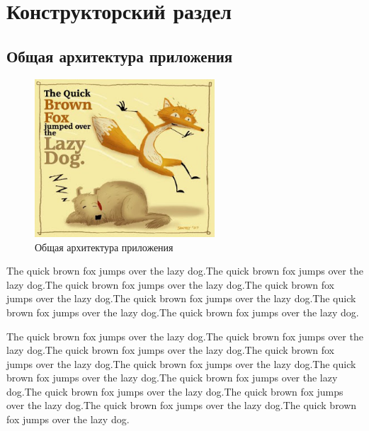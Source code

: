 \chapter{Конструкторский раздел}
\label{cha:design}
\section{Общая архитектура приложения}
\begin{figure}[h!]
	\centering
	\includegraphics[width=0.6\textwidth]{img/fox.jpg}
	\caption{Общая архитектура приложения}
	\label{fig:spire09}
\end{figure}
The quick brown fox jumps over the lazy dog.The quick brown fox jumps over the lazy dog.The quick brown fox jumps over the lazy dog.The quick brown fox jumps over the lazy dog.The quick brown fox jumps over the lazy dog.The quick brown fox jumps over the lazy dog.The quick brown fox jumps over the lazy dog.


The quick brown fox jumps over the lazy dog.The quick brown fox jumps over the lazy dog.The quick brown fox jumps over the lazy dog.The quick brown fox jumps over the lazy dog.The quick brown fox jumps over the lazy dog.The quick brown fox jumps over the lazy dog.The quick brown fox jumps over the lazy dog.The quick brown fox jumps over the lazy dog.The quick brown fox jumps over the lazy dog.The quick brown fox jumps over the lazy dog.The quick brown fox jumps over the lazy dog.


